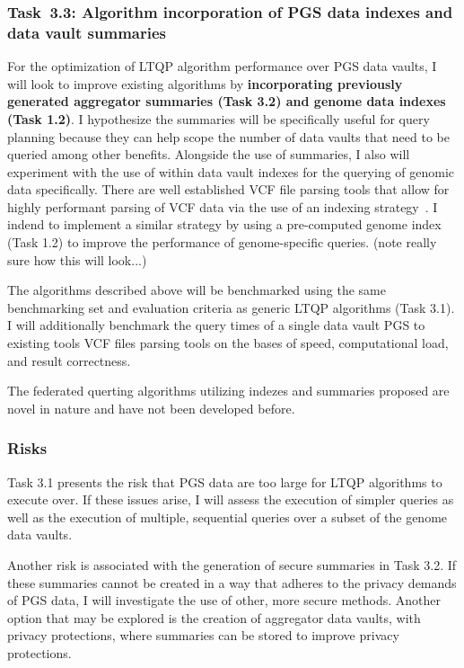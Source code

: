\documentclass[a4paper,11pt]{article}
\begin{document}
\begin{refsection}
\newcommand\WPcc{Algorithm incorporation of PGS data indexes and data vault summaries}
\subsubsection{Task~3.3: \WPcc}

For the optimization of LTQP algorithm performance over PGS data vaults, I will look to improve existing algorithms by \textbf{incorporating previously generated aggregator summaries (Task 3.2) and genome data indexes (Task 1.2)}.
I hypothesize the summaries will be specifically useful for query planning because they can help scope the number of data vaults that need to be queried among other benefits. 
Alongside the use of summaries, I also will experiment with the use of within data vault indexes for the querying of genomic data specifically. 
There are well established VCF file parsing tools that allow for highly performant parsing of VCF data via the use of an indexing strategy~\cite{yang_seqminer2_2020}. 
I indend to implement a similar strategy by using a pre-computed genome index (Task 1.2) to improve the performance of genome-specific queries. 
(note really sure how this will look...)

The algorithms described above will be benchmarked using the same benchmarking set and evaluation criteria as generic LTQP algorithms (Task 3.1). 
I will additionally benchmark the query times of a single data vault PGS to existing tools VCF files parsing tools on the bases of speed, computational load, and result correctness.

The federated querting algorithms utilizing indezes and summaries proposed are novel in nature and have not been developed before. 

\subsubsection{Risks}
Task 3.1 presents the risk that PGS data are too large for LTQP algorithms to execute over. 
If these issues arise, I will assess the execution of simpler queries as well as the execution of multiple, sequential queries over a subset of the genome data vaults.

Another risk is associated with the generation of secure summaries in Task 3.2. 
If these summaries cannot be created in a way that adheres to the privacy demands of PGS data, I will investigate the use of other, more secure methods.
Another option that may be explored is the creation of aggregator data vaults, with privacy protections, where summaries can be stored to improve privacy protections.


\end{refsection}
\end{document}
